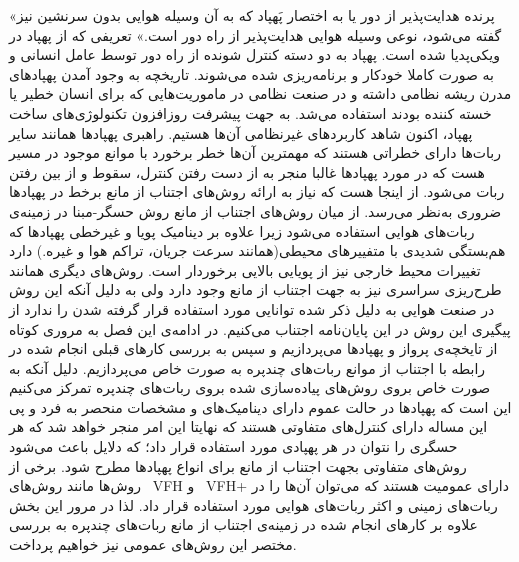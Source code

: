 «پرنده هدایت‌پذیر از دور یا به اختصار پَهپاد که به آن وسیله هوایی بدون سرنشین نیز گفته می‌شود، نوعی وسیله هوایی هدایت‌پذیر از راه دور است.» تعریفی که از پهپاد در ویکی‌پدیا شده است. پهپاد به دو دسته کنترل شونده از راه دور توسط عامل انسانی و به صورت کاملا خودکار و برنامه‌ریزی شده می‌شوند. تاریخچه به وجود آمدن پهپادهای مدرن ریشه نظامی داشته و در صنعت نظامی در ماموریت‌هایی که برای انسان خطیر یا خسته کننده بودند استفاده می‌شد. به جهت پیشرفت روزافزون تکنولوژی‌های ساخت پهپاد، اکنون شاهد کاربردهای غیرنظامی آن‌ها هستیم. راهبری پهپادها همانند سایر ربات‌ها دارای خطراتی هستند که مهمترین آن‌ها خطر برخورد با موانع موجود در مسیر هست که در مورد پهپادها غالبا منجر به از دست رفتن کنترل، سقوط و از بین رفتن ربات می‌شود. از اینجا هست که نیاز به ارائه روش‌های اجتناب از مانع برخط در پهپادها ضروری به‌نظر می‌رسد. از میان روش‌های اجتناب از مانع روش حسگر-مبنا در زمینه‌ی ربات‌های هوایی استفاده می‌شود زیرا علاوه بر دینامیک پویا و غیرخطی پهپادها که هم‌بستگی شدیدی با متفییرهای محیطی(همانند سرعت جریان، تراکم هوا و غیره.) دارد تغییرات محیط خارجی نیز از پویایی بالایی برخوردار است. روش‌های دیگری همانند طرح‌ریزی سراسری نیز به جهت اجتناب از مانع وجود دارد ولی به دلیل آنکه این روش در صنعت هوایی به دلیل ذکر شده توانایی مورد استفاده قرار گرفته شدن را ندارد از پیگیری این روش در این پایان‌نامه اجتناب می‌کنیم.
در ادامه‌ی این فصل به مروری کوتاه از تایخچه‌ی پرواز و پهپادها می‌پردازیم و سپس به بررسی کارهای قبلی انجام شده در رابطه با اجتناب از موانع ربات‌های چندپره به صورت خاص می‌پردازیم. دلیل آنکه به صورت خاص بروی روش‌های پیاده‌سازی شده بروی ربات‌های چندپره تمرکز می‌کنیم این است که پهپادها در حالت عموم دارای دینامیک‌های و مشخصات منحصر به فرد و پی این مساله دارای کنترل‌های متفاوتی هستند که نهایتا این امر منجر خواهد شد که هر حسگری را نتوان در هر پهپادی مورد استفاده قرار داد؛ که دلایل باعث می‌شود روش‌های متفاوتی بجهت اجتناب از مانع برای انواع پهپادها مطرح شود. برخی از روش‌ها مانند روش‌های \ {VFH} و \ {VFH+} دارای عمومیت هستند که می‌توان آن‌ها را در ربات‌های زمینی و اکثر ربات‌های هوایی مورد استفاده قرار داد. لذا در مرور این بخش علاوه بر کارهای انجام شده در زمینه‌ی اجتناب از مانع ربات‌های چندپره به بررسی مختصر این روش‌های عمومی نیز خواهیم پرداخت.